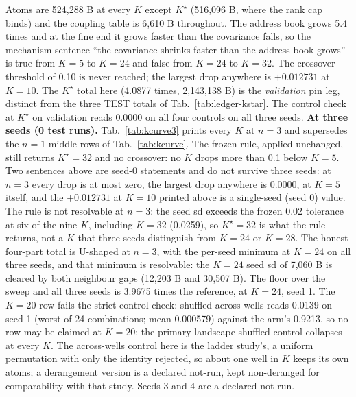 \documentclass{article} %
\newcommand{\Kstar}{\ensuremath{K^{\star}}}
\begin{document}
\noindent Atoms are 524,288 B at every $K$ except $\Kstar$ (516,096 B, where the rank cap binds) and
the coupling table is 6,610 B throughout. The address book grows 5.4 times and at the fine end it
grows faster than the covariance falls, so the mechanism sentence ``the covariance shrinks faster
than the address book grows'' is true from $K=5$ to $K=24$ and false from $K=24$ to $K=32$. The
crossover threshold of 0.10 is never reached; the largest drop anywhere is $+0.012731$ at $K=10$.
The $\Kstar$ total here (4.0877 times, 2,143,138 B) is the \emph{validation} pin leg, distinct from
the three TEST totals of Tab.~\ref{tab:ledger-kstar}. %
The control check at $\Kstar$ on validation reads 0.0000 on all four controls on all three seeds.
\textbf{At three seeds (0 test runs).} Tab.~\ref{tab:kcurve3} prints
every $K$ at $n=3$ and supersedes the $n=1$ middle rows of Tab.~\ref{tab:kcurve}.
The frozen rule, applied unchanged, still returns $\Kstar=32$ and no crossover: no $K$ drops more
than 0.1 below $K=5$. Two sentences above are seed-0 statements and do not survive three seeds: at
$n=3$ every drop is at most zero, the largest drop anywhere is 0.0000, at $K=5$ itself, and the
$+0.012731$ at $K=10$ printed above is a single-seed (seed 0) value. The rule is not resolvable at $n=3$: the seed sd
exceeds the frozen 0.02 tolerance at six of the nine $K$, including $K=32$ (0.0259), so $\Kstar=32$
is what the rule returns, not a $K$ that three seeds distinguish from $K=24$ or $K=28$. The honest
four-part total is U-shaped at $n=3$, with the per-seed minimum at $K=24$ on all three seeds, and
that minimum is resolvable: the $K=24$ seed sd of 7,060 B is cleared by both neighbour gaps (12,203
B and 30,507 B). The floor over the sweep and all three seeds is 3.9675 times the reference, at
$K=24$, seed 1. The $K=20$ row fails the strict control check:
shuffled across wells reads 0.0139 on seed 1 (worst of 24 combinations; mean
0.000579) against the arm's 0.9213, so no row may be claimed at $K=20$; the primary
landscape shuffled control collapses at every $K$. The across-wells control here is
the ladder study's, a uniform permutation with only the identity rejected, so about one well in $K$ keeps its
own atoms; a derangement version is a declared not-run, kept non-deranged for comparability with
that study. Seeds 3 and 4 are a declared not-run.
\end{document}
